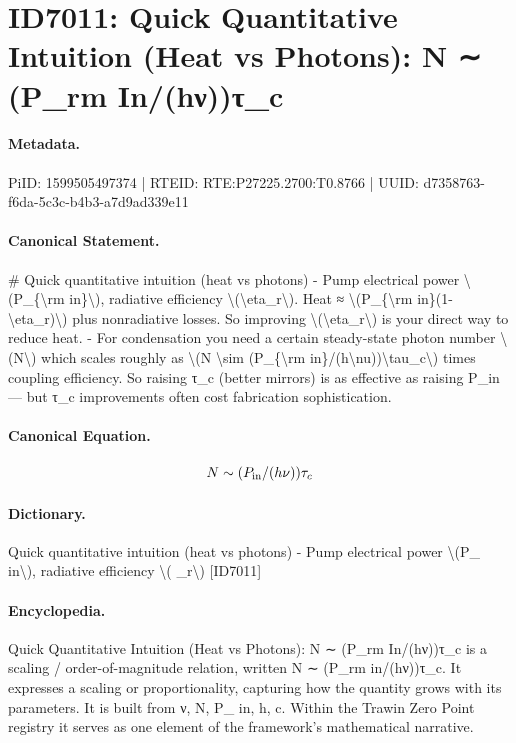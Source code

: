 \section*{ID7011: Quick Quantitative Intuition (Heat vs Photons): N ∼ (P\_rm In/(hν))τ\_c}
\paragraph{Metadata.}
PiID: 1599505497374 | RTEID: RTE:P27225.2700:T0.8766 | UUID: d7358763-f6da-5c3c-b4b3-a7d9ad339e11

\paragraph{Canonical Statement.}
\# Quick quantitative intuition (heat vs photons) - Pump electrical power \textbackslash{}(P\_\{\textbackslash{}rm in\}\textbackslash{}), radiative efficiency \textbackslash{}(\textbackslash{}eta\_r\textbackslash{}). Heat ≈ \textbackslash{}(P\_\{\textbackslash{}rm in\}(1-\textbackslash{}eta\_r)\textbackslash{}) plus nonradiative losses. So improving \textbackslash{}(\textbackslash{}eta\_r\textbackslash{}) is your direct way to reduce heat. - For condensation you need a certain steady-state photon number \textbackslash{}(N\textbackslash{}) which scales roughly as \textbackslash{}(N \textbackslash{}sim (P\_\{\textbackslash{}rm in\}/(h\textbackslash{}nu))\textbackslash{}tau\_c\textbackslash{}) times coupling efficiency. So raising τ\_c (better mirrors) is as effective as raising P\_in — but τ\_c improvements often cost fabrication sophistication.

\paragraph{Canonical Equation.}
\[
N \sim (P_{\rm in}/(h\nu))\tau_c
\]

\paragraph{Dictionary.}
Quick quantitative intuition (heat vs photons) - Pump electrical power \textbackslash{}(P\_ in\textbackslash{}), radiative efficiency \textbackslash{}( \_r\textbackslash{}) [ID7011]

\paragraph{Encyclopedia.}
Quick Quantitative Intuition (Heat vs Photons): N ∼ (P\_rm In/(hν))τ\_c is a scaling / order-of-magnitude relation, written N ∼ (P\_rm in/(hν))τ\_c. It expresses a scaling or proportionality, capturing how the quantity grows with its parameters. It is built from ν, N, P\_ in, h, c. Within the Trawin Zero Point registry it serves as one element of the framework's mathematical narrative.
